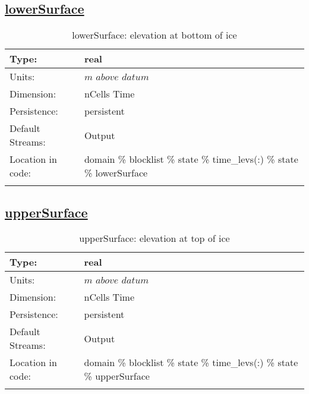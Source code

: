 \subsection[lowerSurface]{\hyperref[sec:var_tab_state]{lowerSurface}}
\label{subsec:var_sec_state_lowerSurface}
\begin{center}
\begin{longtable}{| p{2.0in} | p{4.0in} |}
        \hline 
        Type: & real \\
        \hline 
        Units: & $m$ $above$ $datum$ \\
        \hline 
        Dimension: & nCells Time \\
        \hline 
        Persistence: & persistent \\
        \hline 
		 Default Streams: & Output  \\
        \hline 
		 Location in code: & domain \% blocklist \% state \% time\_levs(:) \% state \% lowerSurface \\
		 \hline 
    \caption{lowerSurface: elevation at bottom of ice}
\end{longtable}
\end{center}
\subsection[upperSurface]{\hyperref[sec:var_tab_state]{upperSurface}}
\label{subsec:var_sec_state_upperSurface}
\begin{center}
\begin{longtable}{| p{2.0in} | p{4.0in} |}
        \hline 
        Type: & real \\
        \hline 
        Units: & $m$ $above$ $datum$ \\
        \hline 
        Dimension: & nCells Time \\
        \hline 
        Persistence: & persistent \\
        \hline 
		 Default Streams: & Output  \\
        \hline 
		 Location in code: & domain \% blocklist \% state \% time\_levs(:) \% state \% upperSurface \\
		 \hline 
    \caption{upperSurface: elevation at top of ice}
\end{longtable}
\end{center}
